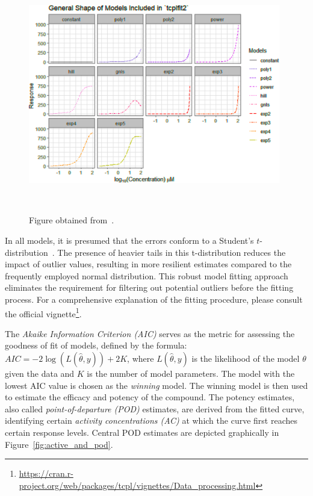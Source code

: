 \begin{figure}
    \centering
    \includegraphics[width=0.98\textwidth]{figures/fit_models.png}
    \caption{Figure obtained from~\cite{tcplv3.0}.}
~\label{fig:tcplfit2_models}
\end{figure}

In all models, it is presumed that the errors conform to a Student's $t$-distribution~\cite{tcplv3.0}. The presence of heavier tails in this t-distribution reduces the impact of outlier values, resulting in more resilient estimates compared to the frequently employed normal distribution. This robust model fitting approach eliminates the requirement for filtering out potential outliers before the fitting process. For a comprehensive explanation of the fitting procedure, please consult the official vignette\footnote{\url{https://cran.r-project.org/web/packages/tcpl/vignettes/Data_processing.html}}.

The \emph{Akaike Information Criterion (AIC)} serves as the metric for assessing the goodness of fit of models, defined by the formula: $AIC = -2\log(L(\hat{\theta}, y)) + 2K$, where $L(\hat{\theta}, y)$ is the likelihood of the model $\theta$ given the data and $K$ is the number of model parameters. The model with the lowest AIC value is chosen as the \emph{winning} model. The winning model is then used to estimate the efficacy and potency of the compound. The potency estimates, also called \emph{point-of-departure (POD)} estimates, are derived from the fitted curve, identifying certain \emph{activity concentrations (AC)} at which the curve first reaches certain response levels. Central POD estimates are depicted graphically in Figure~\ref{fig:active_and_pod}.


